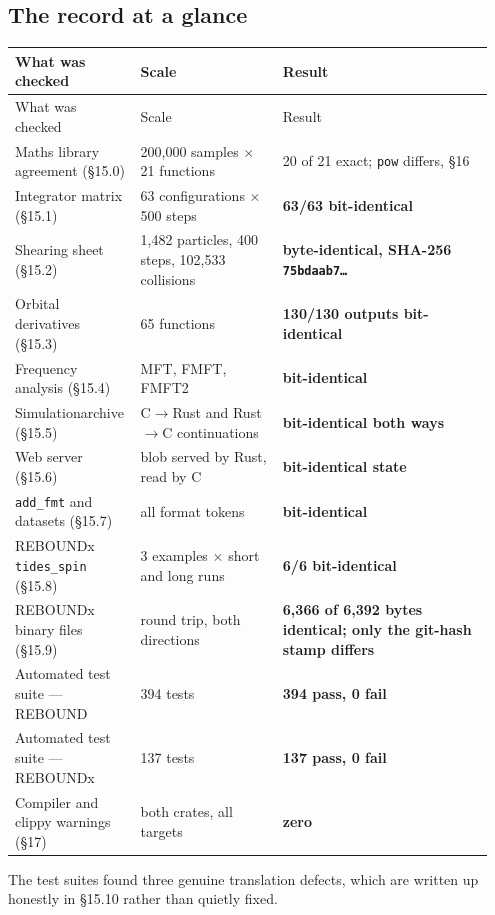 \documentclass[11pt]{article}
\begin{document}
\subsection{The record at a glance}

\begin{longtable}{L{0.220\linewidth}L{0.297\linewidth}L{0.433\linewidth}}
\toprule
What was checked & Scale & Result \\
\midrule
\endfirsthead
\toprule
What was checked & Scale & Result \\
\midrule
\endhead
Maths library agreement (\S{}15.0) & 200,000 samples \(\times\) 21 functions & 20 of 21 exact; \texttt{pow} differs, \S{}16 \\
Integrator matrix (\S{}15.1) & 63 configurations \(\times\) 500 steps & \textbf{63/63 bit-identical} \\
Shearing sheet (\S{}15.2) & 1,482 particles, 400 steps, 102,533 collisions & \textbf{byte-identical, SHA-256 \texttt{75bdaab7\ldots{}}} \\
Orbital derivatives (\S{}15.3) & 65 functions & \textbf{130/130 outputs bit-identical} \\
Frequency analysis (\S{}15.4) & MFT, FMFT, FMFT2 & \textbf{bit-identical} \\
Simulationarchive (\S{}15.5) & C\(\rightarrow\)Rust and Rust\(\rightarrow\)C continuations & \textbf{bit-identical both ways} \\
Web server (\S{}15.6) & blob served by Rust, read by C & \textbf{bit-identical state} \\
\texttt{add\_fmt} and datasets (\S{}15.7) & all format tokens & \textbf{bit-identical} \\
REBOUNDx \texttt{tides\_spin} (\S{}15.8) & 3 examples \(\times\) short and long runs & \textbf{6/6 bit-identical} \\
REBOUNDx binary files (\S{}15.9) & round trip, both directions & \textbf{6,366 of 6,392 bytes identical; only the git-hash stamp differs} \\
Automated test suite --- REBOUND & 394 tests & \textbf{394 pass, 0 fail} \\
Automated test suite --- REBOUNDx & 137 tests & \textbf{137 pass, 0 fail} \\
Compiler and clippy warnings (\S{}17) & both crates, all targets & \textbf{zero} \\
\bottomrule
\end{longtable}

The test suites found three genuine translation defects, which are written up honestly in \S{}15.10 rather than quietly fixed.
\end{document}

